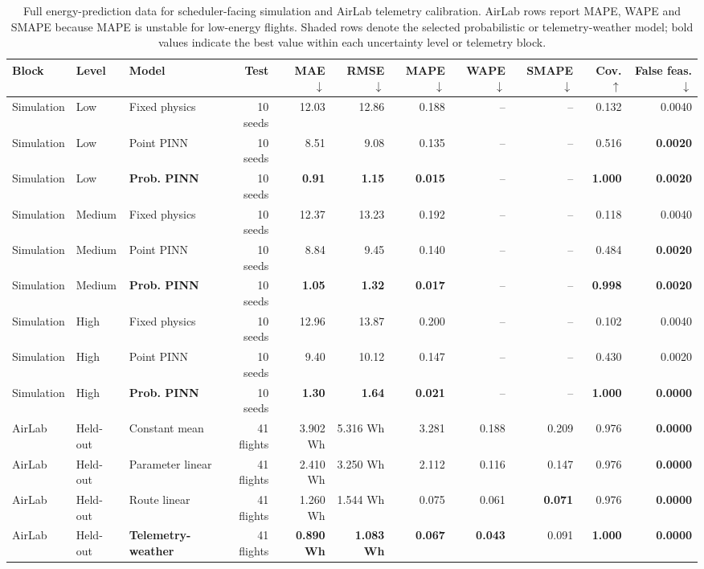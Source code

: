 \begin{table}[H]
\centering
\caption{Full energy-prediction data for scheduler-facing simulation and AirLab telemetry calibration. AirLab rows report MAPE, WAPE and SMAPE because MAPE is unstable for low-energy flights. Shaded rows denote the selected probabilistic or telemetry-weather model; bold values indicate the best value within each uncertainty level or telemetry block.}
\label{tab:energy-evidence}
\small
\setlength{\tabcolsep}{2.1pt}
\begin{tabular}{@{}lllrrrrrrrr@{}}
\toprule
Block & Level & Model & Test & MAE $\downarrow$ & RMSE $\downarrow$ & MAPE $\downarrow$ & WAPE $\downarrow$ & SMAPE $\downarrow$ & Cov. $\uparrow$ & False feas. $\downarrow$ \\
\midrule
Simulation & Low & Fixed physics & 10 seeds & 12.03 & 12.86 & 0.188 & -- & -- & 0.132 & 0.0040 \\
Simulation & Low & Point PINN & 10 seeds & 8.51 & 9.08 & 0.135 & -- & -- & 0.516 & \textbf{0.0020} \\
\rowcolor{gray!10}
Simulation & Low & \textbf{Prob. PINN} & 10 seeds & \textbf{0.91} & \textbf{1.15} & \textbf{0.015} & -- & -- & \textbf{1.000} & \textbf{0.0020} \\
\addlinespace[2pt]
Simulation & Medium & Fixed physics & 10 seeds & 12.37 & 13.23 & 0.192 & -- & -- & 0.118 & 0.0040 \\
Simulation & Medium & Point PINN & 10 seeds & 8.84 & 9.45 & 0.140 & -- & -- & 0.484 & \textbf{0.0020} \\
\rowcolor{gray!10}
Simulation & Medium & \textbf{Prob. PINN} & 10 seeds & \textbf{1.05} & \textbf{1.32} & \textbf{0.017} & -- & -- & \textbf{0.998} & \textbf{0.0020} \\
\addlinespace[2pt]
Simulation & High & Fixed physics & 10 seeds & 12.96 & 13.87 & 0.200 & -- & -- & 0.102 & 0.0040 \\
Simulation & High & Point PINN & 10 seeds & 9.40 & 10.12 & 0.147 & -- & -- & 0.430 & 0.0020 \\
\rowcolor{gray!10}
Simulation & High & \textbf{Prob. PINN} & 10 seeds & \textbf{1.30} & \textbf{1.64} & \textbf{0.021} & -- & -- & \textbf{1.000} & \textbf{0.0000} \\
\addlinespace[2pt]
AirLab & Held-out & Constant mean & 41 flights & 3.902 Wh & 5.316 Wh & 3.281 & 0.188 & 0.209 & 0.976 & \textbf{0.0000} \\
AirLab & Held-out & Parameter linear & 41 flights & 2.410 Wh & 3.250 Wh & 2.112 & 0.116 & 0.147 & 0.976 & \textbf{0.0000} \\
AirLab & Held-out & Route linear & 41 flights & 1.260 Wh & 1.544 Wh & 0.075 & 0.061 & \textbf{0.071} & 0.976 & \textbf{0.0000} \\
\rowcolor{gray!10}
AirLab & Held-out & \textbf{Telemetry-weather} & 41 flights & \textbf{0.890 Wh} & \textbf{1.083 Wh} & \textbf{0.067} & \textbf{0.043} & 0.091 & \textbf{1.000} & \textbf{0.0000} \\
\bottomrule
\end{tabular}
\end{table}

